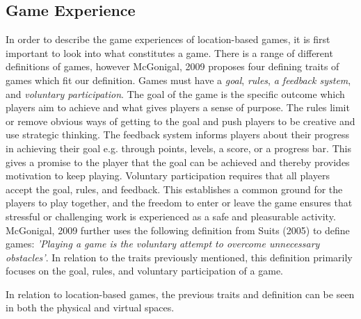 \subsection{Game Experience}
In order to describe the game experiences of location-based games, it is first important to look into what constitutes a game. There is a range of different definitions of games, however McGonigal, 2009 \cite{RealityIsBroken} proposes four defining traits of games which fit our definition. Games must have a \textit{goal}, \textit{rules}, \textit{a feedback system}, and \textit{voluntary participation}. The goal of the game is the specific outcome which players aim to achieve and what gives players a sense of purpose. The rules limit or remove obvious ways of getting to the goal and push players to be creative and use strategic thinking. The feedback system informs players about their progress in achieving their goal e.g. through points, levels, a score, or a progress bar. This gives a promise to the player that the goal can be achieved and thereby provides motivation to keep playing. Voluntary participation requires that all players accept the goal, rules, and feedback. This establishes a common ground for the players to play together, and the freedom to enter or leave the game ensures that stressful or challenging work is experienced as a safe and pleasurable activity. McGonigal, 2009 \cite{RealityIsBroken} further uses the following definition from Suits (2005) \cite{grasshopper} to define games: \emph{'Playing a game is the voluntary attempt to overcome unnecessary obstacles'}. In relation to the traits previously mentioned, this definition primarily focuses on the goal, rules, and voluntary participation of a game. 

In relation to location-based games, the previous traits and definition can be seen in both the physical and virtual spaces.




